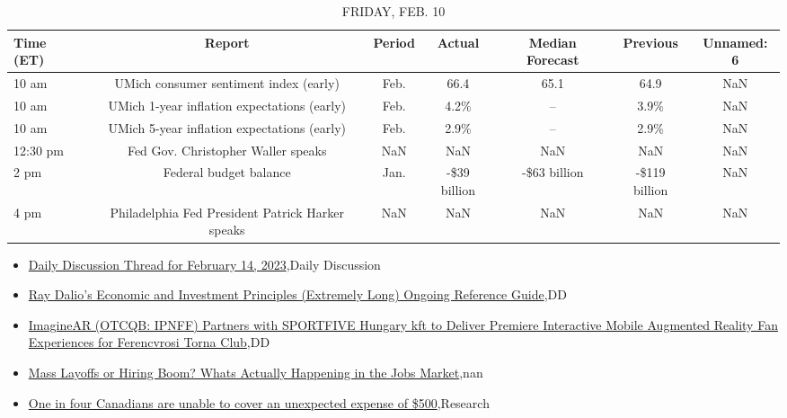 \documentclass{article}%
\begin{document}
%


\begin{table}[htbp]%
\caption{FRIDAY, FEB. 10}%
\centering%
\begin{adjustbox}{width=1\textwidth}%
\begin{tabular}{lcccccc}
\toprule
Time (ET) &                                           Report & Period &       Actual & Median Forecast &      Previous & Unnamed: 6 \\
\midrule
    10 am &           UMich consumer sentiment index (early) &   Feb. &         66.4 &            65.1 &          64.9 &        NaN \\
    10 am &      UMich 1-year inflation expectations (early) &   Feb. &         4.2\% &              -- &          3.9\% &        NaN \\
    10 am &      UMich 5-year inflation expectations (early) &   Feb. &         2.9\% &              -- &          2.9\% &        NaN \\
 12:30 pm &               Fed Gov. Christopher Waller speaks &    NaN &          NaN &             NaN &           NaN &        NaN \\
     2 pm &                           Federal budget balance &   Jan. & -\$39 billion &    -\$63 billion & -\$119 billion &        NaN \\
     4 pm & Philadelphia Fed President Patrick Harker speaks &    NaN &          NaN &             NaN &           NaN &        NaN \\
\bottomrule
\end{tabular}
%
\end{adjustbox}%
\end{table}

%
\begin{itemize}%
\item%
\href{https://reddit.com/r/wallstreetbets/comments/1122o82/daily\_discussion\_thread\_for\_february\_14\_2023/}{Daily Discussion Thread for February 14, 2023},Daily Discussion%
\item%
\href{https://reddit.com/r/wallstreetbets/comments/111wxfx/ray\_dalios\_economic\_and\_investment\_principles/}{Ray Dalio's Economic and Investment Principles (Extremely Long) Ongoing Reference Guide},DD%
\item%
\href{https://reddit.com/r/Baystreetbets/comments/111gw8a/imaginear\_otcqb\_ipnff\_partners\_with\_sportfive/}{ImagineAR (OTCQB: IPNFF) Partners with SPORTFIVE Hungary kft to Deliver Premiere Interactive Mobile Augmented Reality Fan Experiences for Ferencvrosi Torna Club},DD%
\item%
\href{https://reddit.com/r/Economics/comments/111trqs/mass\_layoffs\_or\_hiring\_boom\_whats\_actually/}{Mass Layoffs or Hiring Boom? Whats Actually Happening in the Jobs Market},nan%
\item%
\href{https://reddit.com/r/Economics/comments/111pgm0/one\_in\_four\_canadians\_are\_unable\_to\_cover\_an/}{One in four Canadians are unable to cover an unexpected expense of \$500},Research%
\end{itemize}%
\end{document}
